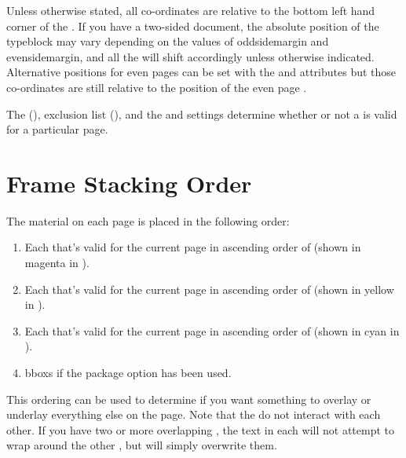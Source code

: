 \documentclass[fontsize=12pt]{scrbook}
\begin{document}
\begin{important}
Unless otherwise stated, all co-ordinates are relative to the
bottom left hand corner of the . If you have
a two-sided document, the absolute position of the \gls*{typeblock} 
may vary depending on the values of \gls{oddsidemargin} 
and \gls{evensidemargin}, and all the  will shift
accordingly unless otherwise indicated. Alternative positions for
even pages can be set with the  and 
attributes but those co-ordinates are still relative to the position of the even
page .
\end{important}

The  (), exclusion list
(), and the  and
 settings determine whether or not a
 is valid for a particular page.

\section{Frame Stacking Order}
\label{sec:stacking}


The material on each page is placed in the following order:
\begin{enumerate}
\item Each  that's valid for the current page in ascending
order of  (shown in magenta in ).

\item Each  that's valid for the current page in ascending
order of  (shown in yellow in ).

\item Each  that's valid for the current page in ascending
order of  (shown in cyan in ).

\item \Glspl{bbox} if the  package option has been used.
\end{enumerate}

This ordering can be used to determine if you want something
to overlay or underlay everything else on the page.
Note that the  do not interact with each other. If
you have two or more overlapping , the text in each 
 will not attempt to wrap around the other 
, but will simply overwrite them.
\end{document}
